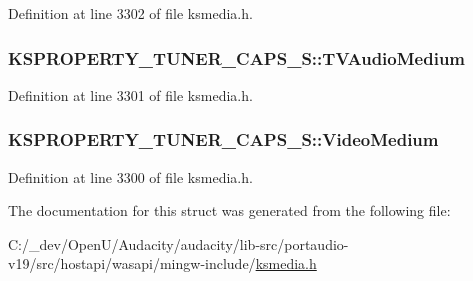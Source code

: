 Definition at line 3302 of file ksmedia.\+h.

\subsubsection[{\texorpdfstring{T\+V\+Audio\+Medium}{TVAudioMedium}}]{ K\+S\+P\+R\+O\+P\+E\+R\+T\+Y\+\_\+\+T\+U\+N\+E\+R\+\_\+\+C\+A\+P\+S\+\_\+\+S\+::\+T\+V\+Audio\+Medium}\hypertarget{struct_k_s_p_r_o_p_e_r_t_y___t_u_n_e_r___c_a_p_s___s_a491253242a94daaeeed66e3168630b02}{}\label{struct_k_s_p_r_o_p_e_r_t_y___t_u_n_e_r___c_a_p_s___s_a491253242a94daaeeed66e3168630b02}


Definition at line 3301 of file ksmedia.\+h.

\subsubsection[{\texorpdfstring{Video\+Medium}{VideoMedium}}]{ K\+S\+P\+R\+O\+P\+E\+R\+T\+Y\+\_\+\+T\+U\+N\+E\+R\+\_\+\+C\+A\+P\+S\+\_\+\+S\+::\+Video\+Medium}\hypertarget{struct_k_s_p_r_o_p_e_r_t_y___t_u_n_e_r___c_a_p_s___s_a8af71eca0c8cf663f772c10782f0de54}{}\label{struct_k_s_p_r_o_p_e_r_t_y___t_u_n_e_r___c_a_p_s___s_a8af71eca0c8cf663f772c10782f0de54}


Definition at line 3300 of file ksmedia.\+h.



The documentation for this struct was generated from the following file\+:\begin{DoxyCompactItemize}
\item 
C\+:/\+\_\+dev/\+Open\+U/\+Audacity/audacity/lib-\/src/portaudio-\/v19/src/hostapi/wasapi/mingw-\/include/\hyperlink{ksmedia_8h}{ksmedia.\+h}\end{DoxyCompactItemize}
